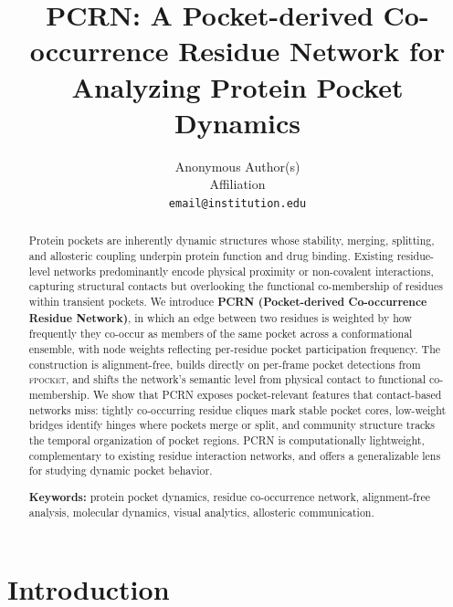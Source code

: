 \documentclass[11pt,a4paper]{article}
\title{\textbf{PCRN: A Pocket-derived Co-occurrence Residue Network for
       Analyzing Protein Pocket Dynamics}}
\author{Anonymous Author(s) \\ \small Affiliation \\
        \small \texttt{email@institution.edu}}
\date{}
\begin{document}

\maketitle

\begin{abstract}
\noindent
Protein pockets are inherently dynamic structures whose stability,
merging, splitting, and allosteric coupling underpin protein function
and drug binding. Existing residue-level networks predominantly encode
physical proximity or non-covalent interactions, capturing structural
contacts but overlooking the functional co-membership of residues
within transient pockets. We introduce \textbf{PCRN
(Pocket-derived Co-occurrence Residue Network)}, in which an edge
between two residues is weighted by how frequently they co-occur as
members of the same pocket across a conformational ensemble, with node
weights reflecting per-residue pocket participation frequency. The
construction is alignment-free, builds directly on per-frame pocket
detections from \textsc{fpocket}, and shifts the network's semantic
level from physical contact to functional co-membership. We show that
PCRN exposes pocket-relevant features that contact-based networks
miss: tightly co-occurring residue cliques mark stable pocket cores,
low-weight bridges identify hinges where pockets merge or split, and
community structure tracks the temporal organization of pocket
regions. PCRN is computationally lightweight, complementary to
existing residue interaction networks, and offers a generalizable
lens for studying dynamic pocket behavior.

\medskip
\noindent\textbf{Keywords:} protein pocket dynamics, residue
co-occurrence network, alignment-free analysis, molecular dynamics,
visual analytics, allosteric communication.
\end{abstract}

\section{Introduction}
\end{document}
